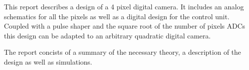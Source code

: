 
This report describes a design of a 4 pixel digital camera.
It includes an analog schematics for all the pixels as well as a digital design for the control unit.
Coupled with a pulse shaper and the square root of the number of pixels ADCs this design can be adapted to an arbitrary
quadratic digital camera.

The report concists of a summary of the necessary theory, a description of the design as well as simulations.
